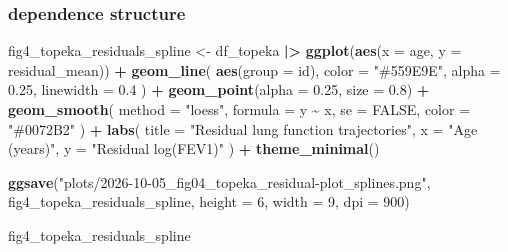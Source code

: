 \documentclass[
]{article}
\newenvironment{Shaded}{\begin{snugshade}}{\end{snugshade}}
\newcommand{\AttributeTok}[1]{\textcolor[rgb]{0.13,0.29,0.53}{#1}}
\newcommand{\ConstantTok}[1]{\textcolor[rgb]{0.56,0.35,0.01}{#1}}
\newcommand{\DecValTok}[1]{\textcolor[rgb]{0.00,0.00,0.81}{#1}}
\newcommand{\FloatTok}[1]{\textcolor[rgb]{0.00,0.00,0.81}{#1}}
\newcommand{\FunctionTok}[1]{\textcolor[rgb]{0.13,0.29,0.53}{\textbf{#1}}}
\newcommand{\NormalTok}[1]{#1}
\newcommand{\OtherTok}[1]{\textcolor[rgb]{0.56,0.35,0.01}{#1}}
\newcommand{\SpecialCharTok}[1]{\textcolor[rgb]{0.81,0.36,0.00}{\textbf{#1}}}
\newcommand{\StringTok}[1]{\textcolor[rgb]{0.31,0.60,0.02}{#1}}
\begin{document}
\subsubsection{dependence structure}\label{dependence-structure}

\begin{Shaded}
\end{Shaded}

\begin{Shaded}
\begin{Highlighting}[]
\NormalTok{fig4\_topeka\_residuals\_spline }\OtherTok{\textless{}{-}} 
\NormalTok{  df\_topeka }\SpecialCharTok{|\textgreater{}}
  \FunctionTok{ggplot}\NormalTok{(}\FunctionTok{aes}\NormalTok{(}\AttributeTok{x =}\NormalTok{ age, }\AttributeTok{y =}\NormalTok{ residual\_mean)) }\SpecialCharTok{+}
    \FunctionTok{geom\_line}\NormalTok{(}
      \FunctionTok{aes}\NormalTok{(}\AttributeTok{group =}\NormalTok{ id),}
      \AttributeTok{color =} \StringTok{"\#559E9E"}\NormalTok{,}
      \AttributeTok{alpha =} \FloatTok{0.25}\NormalTok{,}
      \AttributeTok{linewidth =} \FloatTok{0.4}
\NormalTok{    ) }\SpecialCharTok{+}
    \FunctionTok{geom\_point}\NormalTok{(}\AttributeTok{alpha =} \FloatTok{0.25}\NormalTok{, }\AttributeTok{size =} \FloatTok{0.8}\NormalTok{) }\SpecialCharTok{+}
    \FunctionTok{geom\_smooth}\NormalTok{(}
      \AttributeTok{method =} \StringTok{"loess"}\NormalTok{,}
      \AttributeTok{formula =}\NormalTok{ y }\SpecialCharTok{\textasciitilde{}}\NormalTok{ x,}
      \AttributeTok{se =} \ConstantTok{FALSE}\NormalTok{,}
      \AttributeTok{color =} \StringTok{"\#0072B2"}
\NormalTok{    ) }\SpecialCharTok{+}
    \FunctionTok{labs}\NormalTok{(}
      \AttributeTok{title =} \StringTok{"Residual lung function trajectories"}\NormalTok{,}
      \AttributeTok{x =} \StringTok{"Age (years)"}\NormalTok{,}
      \AttributeTok{y =} \StringTok{"Residual log(FEV1)"}
\NormalTok{    ) }\SpecialCharTok{+} \FunctionTok{theme\_minimal}\NormalTok{()}

\FunctionTok{ggsave}\NormalTok{(}\StringTok{"plots/2026{-}10{-}05\_fig04\_topeka\_residual{-}plot\_splines.png"}\NormalTok{,}
\NormalTok{       fig4\_topeka\_residuals\_spline, }\AttributeTok{height =} \DecValTok{6}\NormalTok{, }\AttributeTok{width =} \DecValTok{9}\NormalTok{, }\AttributeTok{dpi =} \DecValTok{900}\NormalTok{)}

\NormalTok{fig4\_topeka\_residuals\_spline}
\end{Highlighting}
\end{Shaded}
\end{document}
